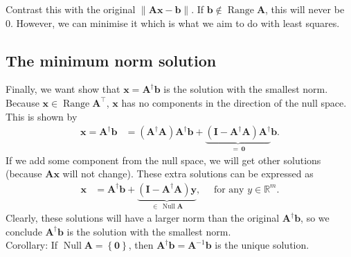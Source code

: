 \documentclass[12pt,a4paper]{article} %
\DeclareMathOperator{\Range}{Range}
\DeclareMathOperator{\Null}{Null}
\begin{document}
Contrast this with the original $\| \mathbf A \bm x - \bm b \|$. If $\bm b \notin \Range \mathbf A$, this will never be 0.
However, we can minimise it which is what we aim to do with least squares. 

\subsection{The minimum norm solution}

Finally, we want show that $\bm x = \mathbf A^\dagger \bm b$ 
is the solution with the smallest norm. Because $\bm x \in \Range \mathbf A^\top$, 
$\bm x$ has no components in the direction of  the null space. This is shown by 
\begin{align*}
    \bm x=\mathbf A^\dagger \bm b &= (\mathbf A^\dagger \mathbf A)\mathbf A^\dagger\bm b + \underbrace{(\mathbf I - \mathbf A^\dagger \mathbf A)\mathbf A^\dagger}_{=\,\bm 0}\bm b.
\end{align*}
If we add some component from the null space, we will get other solutions (because $\mathbf A \bm x$ will not change). 
These extra solutions can be expressed as
\begin{align*}
    \bm x &= \mathbf A^\dagger\bm b + \underbrace{(\mathbf I - \mathbf A^\dagger \mathbf A)\bm y}_{\in \,\Null \mathbf A}, \quad \text{ for any }y \in \mathbb R^m.
\end{align*}
Clearly, these solutions will have a larger norm than the original $\mathbf A^\dagger \bm b$, so we conclude 
$\mathbf A^\dagger \bm b$  is the solution with the smallest norm. \\[1em]
Corollary: If $\Null \mathbf A = \left\{ \bm 0\right\}$, then $\mathbf A^\dagger \bm b = \mathbf A^{-1} \bm b$ is the unique solution.
\end{document}
